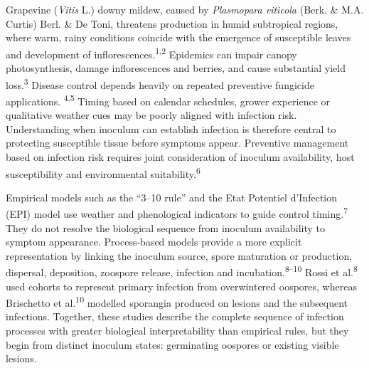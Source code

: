 \documentclass{article}
\begin{document}
Grapevine (\emph{Vitis} L.) downy mildew, caused by \emph{Plasmopara viticola} (Berk. \& M.A.
Curtis) Berl. \& De Toni, threatens
production in humid subtropical regions, where warm, rainy conditions
coincide with the emergence of susceptible leaves and development of
inflorescences.\textsuperscript{1,2} Epidemics
can impair canopy photosynthesis, damage inflorescences and berries, and
cause substantial yield loss.\textsuperscript{3} Disease
control depends heavily on repeated preventive fungicide applications.
\textsuperscript{4,5} Timing based on calendar
schedules, grower experience or qualitative weather cues may be poorly
aligned with infection risk. Understanding when inoculum can establish
infection is therefore central to protecting susceptible tissue before
symptoms appear. Preventive management based on infection risk
requires joint consideration of inoculum availability, host
susceptibility and environmental suitability.\textsuperscript{6}

Empirical models such as the ``3--10 rule'' and the Etat Potentiel
d'Infection (EPI) model use weather and phenological indicators to guide
control timing.\textsuperscript{7}
They do not resolve the biological sequence
from inoculum availability to symptom appearance. Process-based models
provide a more explicit representation by linking the inoculum source,
spore maturation or production, dispersal, deposition, zoospore release,
infection and incubation.\textsuperscript{8--10} Rossi et al.\textsuperscript{8}
used cohorts to represent primary infection from overwintered oospores,
whereas Brischetto et al.\textsuperscript{10} modelled
sporangia produced on lesions and the subsequent infections. Together, these
studies describe the complete sequence of infection processes with greater biological
interpretability than empirical rules, but they begin from distinct
inoculum states: germinating oospores or existing visible lesions.
\end{document}
